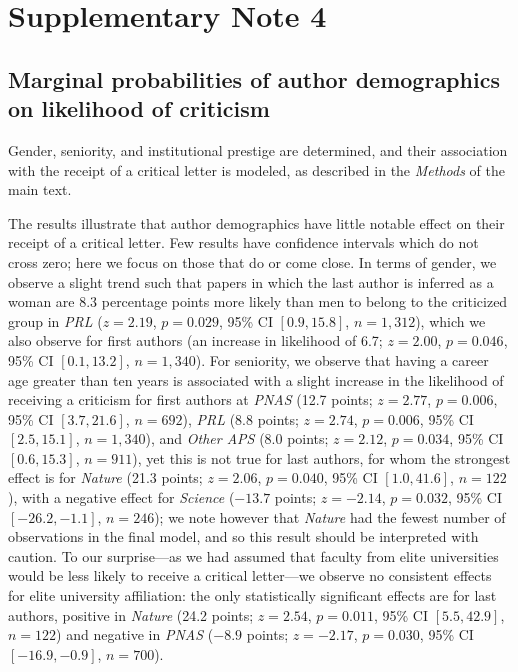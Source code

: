 \documentclass[12pt]{article} %
\begin{document}
\section*{Supplementary Note 4}
\label{si:text:marginal-prob}
\subsection*{Marginal probabilities of author demographics on likelihood of criticism}
Gender, seniority, and institutional prestige are determined, and their association with the receipt of a critical letter is modeled, as described in the \textit{Methods} of the main text.

The results illustrate that author demographics have little notable effect on their receipt of a critical letter. 
Few results have confidence intervals which do not cross zero;
here we focus on those that do or come close. 
In terms of gender, we observe a slight trend such that papers in which the last author is inferred as a woman are 8.3 percentage points more likely than men to belong to the criticized group in \textit{PRL} ($z = 2.19$, $p = 0.029$, 95\% CI $[0.9, 15.8]$, $n = 1{,}312$), which we also observe for first authors (an increase in likelihood of 6.7; $z = 2.00$, $p = 0.046$, 95\% CI $[0.1, 13.2]$, $n = 1{,}340$).
For seniority, we observe that having a career age greater than ten years is associated with a slight increase in the likelihood of receiving a criticism for first authors at \textit{PNAS} (12.7 points; $z = 2.77$, $p = 0.006$, 95\% CI $[3.7, 21.6]$, $n = 692$), \textit{PRL} (8.8 points; $z = 2.74$, $p = 0.006$, 95\% CI $[2.5, 15.1]$, $n = 1{,}340$), and \textit{Other APS} (8.0 points; $z = 2.12$, $p = 0.034$, 95\% CI $[0.6, 15.3]$, $n = 911$), yet this is not true for last authors, for whom the strongest effect is for \textit{Nature} (21.3 points; $z = 2.06$, $p = 0.040$, 95\% CI $[1.0, 41.6]$, $n = 122$), with a negative effect for \textit{Science} ($-13.7$ points; $z = -2.14$, $p = 0.032$, 95\% CI $[-26.2, -1.1]$, $n = 246$);
we note however that \textit{Nature} had the fewest number of observations in the final model, and so this result should be interpreted with caution. 
To our surprise---as we had assumed that faculty from elite universities would be less likely to receive a critical letter---we observe no consistent effects for elite university affiliation: the only statistically significant effects are for last authors, positive in \textit{Nature} (24.2 points; $z = 2.54$, $p = 0.011$, 95\% CI $[5.5, 42.9]$, $n = 122$) and negative in \textit{PNAS} ($-8.9$ points; $z = -2.17$, $p = 0.030$, 95\% CI $[-16.9, -0.9]$, $n = 700$). 
\end{document}
